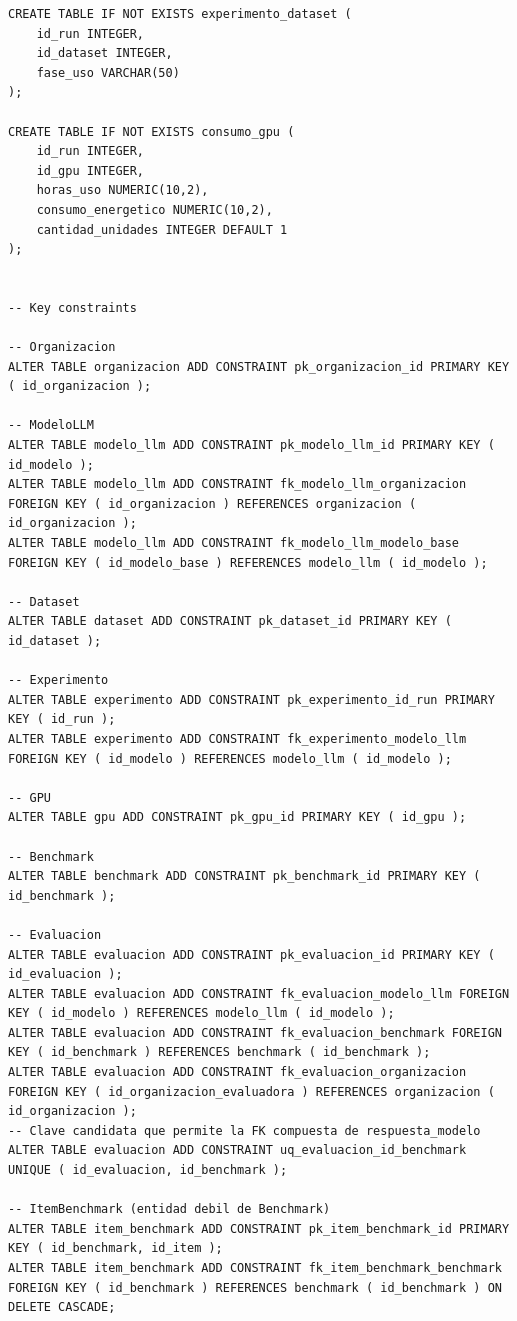 \documentclass[12pt,a4paper]{article}
\begin{document}
\begin{lstlisting}
CREATE TABLE IF NOT EXISTS experimento_dataset (
    id_run INTEGER,
    id_dataset INTEGER,
    fase_uso VARCHAR(50)
);

CREATE TABLE IF NOT EXISTS consumo_gpu (
    id_run INTEGER,
    id_gpu INTEGER,
    horas_uso NUMERIC(10,2),
    consumo_energetico NUMERIC(10,2),
    cantidad_unidades INTEGER DEFAULT 1
);


-- Key constraints

-- Organizacion
ALTER TABLE organizacion ADD CONSTRAINT pk_organizacion_id PRIMARY KEY ( id_organizacion );

-- ModeloLLM
ALTER TABLE modelo_llm ADD CONSTRAINT pk_modelo_llm_id PRIMARY KEY ( id_modelo );
ALTER TABLE modelo_llm ADD CONSTRAINT fk_modelo_llm_organizacion FOREIGN KEY ( id_organizacion ) REFERENCES organizacion ( id_organizacion );
ALTER TABLE modelo_llm ADD CONSTRAINT fk_modelo_llm_modelo_base FOREIGN KEY ( id_modelo_base ) REFERENCES modelo_llm ( id_modelo );

-- Dataset
ALTER TABLE dataset ADD CONSTRAINT pk_dataset_id PRIMARY KEY ( id_dataset );

-- Experimento
ALTER TABLE experimento ADD CONSTRAINT pk_experimento_id_run PRIMARY KEY ( id_run );
ALTER TABLE experimento ADD CONSTRAINT fk_experimento_modelo_llm FOREIGN KEY ( id_modelo ) REFERENCES modelo_llm ( id_modelo );

-- GPU
ALTER TABLE gpu ADD CONSTRAINT pk_gpu_id PRIMARY KEY ( id_gpu );

-- Benchmark
ALTER TABLE benchmark ADD CONSTRAINT pk_benchmark_id PRIMARY KEY ( id_benchmark );

-- Evaluacion
ALTER TABLE evaluacion ADD CONSTRAINT pk_evaluacion_id PRIMARY KEY ( id_evaluacion );
ALTER TABLE evaluacion ADD CONSTRAINT fk_evaluacion_modelo_llm FOREIGN KEY ( id_modelo ) REFERENCES modelo_llm ( id_modelo );
ALTER TABLE evaluacion ADD CONSTRAINT fk_evaluacion_benchmark FOREIGN KEY ( id_benchmark ) REFERENCES benchmark ( id_benchmark );
ALTER TABLE evaluacion ADD CONSTRAINT fk_evaluacion_organizacion FOREIGN KEY ( id_organizacion_evaluadora ) REFERENCES organizacion ( id_organizacion );
-- Clave candidata que permite la FK compuesta de respuesta_modelo
ALTER TABLE evaluacion ADD CONSTRAINT uq_evaluacion_id_benchmark UNIQUE ( id_evaluacion, id_benchmark );

-- ItemBenchmark (entidad debil de Benchmark)
ALTER TABLE item_benchmark ADD CONSTRAINT pk_item_benchmark_id PRIMARY KEY ( id_benchmark, id_item );
ALTER TABLE item_benchmark ADD CONSTRAINT fk_item_benchmark_benchmark FOREIGN KEY ( id_benchmark ) REFERENCES benchmark ( id_benchmark ) ON DELETE CASCADE;


\end{lstlisting}
\end{document}
